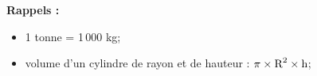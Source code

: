 \documentclass[exercice,a4]{thedocument}%
\begin{document}
{\centering
\begin{minipage}{.6\linewidth}
    \begin{mdframed}
        \noindent\textbf{Rappels :}
        \begin{itemize}[label=--]
            \item 1 tonne = 1\,000 kg;
            \item volume d'un cylindre de rayon  et de hauteur
             : $\pi\times\text{R}^2\times\text{h}$;
        \end{itemize}
    \end{mdframed}
\end{minipage}
\par}
\showthesource
\end{document}
